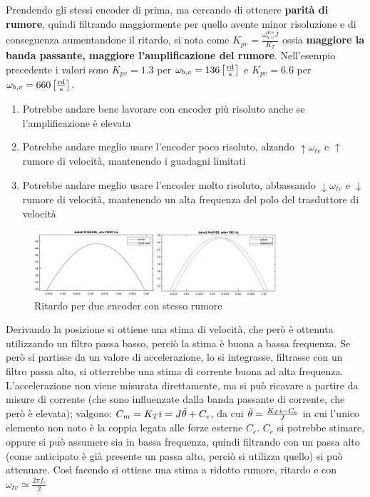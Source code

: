 Prendendo gli stessi encoder di prima, ma cercando di ottenere \textbf{parità di rumore}, quindi filtrando maggiormente per quello avente minor risoluzione e di conseguenza aumentandone il ritardo, si nota come \(K_{pv}=\frac{\omega_{b,v}^{des}J}{K_T}\) ossia \textbf{maggiore la banda passante, maggiore l'amplificazione del rumore}. Nell'esempio precedente i valori sono \(K_{pv}=1.3\) per \(\omega_{b,v}=136 \left[\frac{\text{rd}}{\text{s}}\right]\) e \(K_{pv}=6.6\) per \(\omega_{b,v}=660 \left[\frac{\text{rd}}{\text{s}}\right]\).

\begin{enumerate}
    \item Potrebbe andare bene lavorare con encoder più risoluto anche se l'amplificazione è elevata
    \item Potrebbe andare meglio usare l'encoder poco risoluto, alzando \(\uparrow \omega_{tv}\) e \(\uparrow\) rumore di velocità, mantenendo i guadagni limitati
    \item Potrebbe andare meglio usare l'encoder molto risoluto, abbassando \(\downarrow \omega_{tv}\) e \(\downarrow\) rumore di velocità, mantenendo un alta frequenza del polo del trasduttore di velocità
\end{enumerate}

\begin{figure}[h]
    \centering
    \includegraphics[width=0.8\textwidth]{Immagini/encoder1vs1_stesso_rumore.png}
    \caption{Ritardo per due encoder con stesso rumore}
\end{figure}

Derivando la posizione si ottiene una stima di velocità, che però è ottenuta utilizzando un filtro passa basso, perciò la stima è buona a bassa frequenza.
Se però si partisse da un valore di accelerazione, lo si integrasse, filtrasse con un filtro passa alto, si otterrebbe una stima di corrente buona ad alta frequenza.
L'accelerazione non viene misurata direttamente, ma si può ricavare a partire da misure di corrente (che sono influenzate dalla banda passante di corrente, che però è elevata); valgono: \(C_m=K_T i= J \Ddot{\theta} + C_e\), da cui \(\Ddot{\theta} = \frac{K_T i - C_e}{J}\) in cui l'unico elemento non noto è la coppia legata alle forze esterne \(C_e\).
\(C_e\) si potrebbe stimare, oppure si può assumere sia in bassa frequenza, quindi filtrando con un passa alto (come anticipato è già presente un passa alto, perciò si utilizza quello) si può attenuare.
Così facendo si ottiene una stima a ridotto rumore, ritardo e con \(\omega_{tv}\simeq \frac{2\pi f_c}{2}\)

